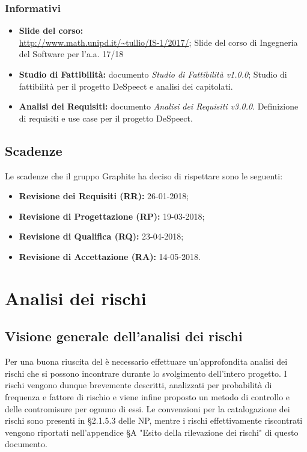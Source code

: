 \documentclass[../PianodiProgetto.tex]{subfiles}
\begin{document}
	\subsection*{Informativi}
	\begin{itemize}
		\item \textbf{Slide del corso:} \\ \url{http://www.math.unipd.it/~tullio/IS-1/2017/};
		\subitem Slide del corso di Ingegneria del Software per l'a.a. 17/18
		\item \textbf{Studio di Fattibilità:} documento \textit{Studio di Fattibilità v1.0.0};
		\subitem Studio di fattibilità per il progetto DeSpeect e analisi dei capitolati.
		\item \textbf{Analisi dei Requisiti:} documento \textit{Analisi dei Requisiti v3.0.0}.
		\subitem Definizione di requisiti e use case per il progetto DeSpeect.
	\end{itemize}
	
	\section{Scadenze}
	Le scadenze che il gruppo Graphite ha deciso di rispettare sono le seguenti:
	\begin{itemize}
		\item \textbf{Revisione dei Requisiti (RR):} 26-01-2018;
		\item \textbf{Revisione di Progettazione (RP):} 19-03-2018;
		\item \textbf{Revisione di Qualifica (RQ):} 23-04-2018;
		\item \textbf{Revisione di Accettazione (RA):} 14-05-2018.
	\end{itemize}
	
	\chapter{Analisi dei rischi}
	
	\section{Visione generale dell'analisi dei rischi}
	
	Per una buona riuscita del  è necessario effettuare un'approfondita analisi dei rischi che si possono incontrare durante lo svolgimento dell'intero progetto. I rischi vengono dunque brevemente descritti, analizzati per probabilità di frequenza e fattore di rischio e viene infine proposto un metodo di controllo e delle contromisure per ognuno di essi. Le convenzioni per la catalogazione dei rischi sono presenti in §2.1.5.3 delle NP, mentre i rischi effettivamente riscontrati vengono riportati nell'appendice §A "Esito della rilevazione dei rischi" di questo documento.
	
\end{document}
